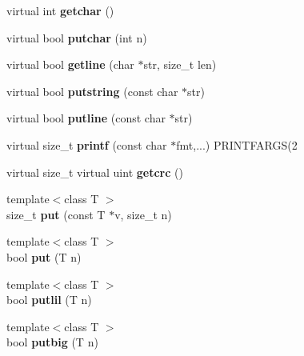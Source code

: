 \begin{DoxyCompactItemize}
virtual int {\bfseries getchar} ()
\item 
\mbox{\label{structstream_a41a4d74c57bebc7e69f9c04f8e6f13c1}} 
virtual bool {\bfseries putchar} (int n)
\item 
\mbox{\label{structstream_a699f7addf5113e0b63219869443d784c}} 
virtual bool {\bfseries getline} (char $\ast$str, size\+\_\+t len)
\item 
\mbox{\label{structstream_ad98a69b7c1f7d6d388b1020c5dcd452a}} 
virtual bool {\bfseries putstring} (const char $\ast$str)
\item 
\mbox{\label{structstream_aabdf3786ae1a58bd8d92f9d4da78e80d}} 
virtual bool {\bfseries putline} (const char $\ast$str)
\item 
\mbox{\label{structstream_abc5967119b7f84b828ff6e0829f3b1b3}} 
virtual size\+\_\+t {\bfseries printf} (const char $\ast$fmt,...) P\+R\+I\+N\+T\+F\+A\+R\+GS(2
\item 
\mbox{\label{structstream_ac80efd5644d173b8f9a4d4233dd81875}} 
virtual size\+\_\+t virtual uint {\bfseries getcrc} ()
\item 
\mbox{\label{structstream_afceda21166198ae324a48abc0e1d9aeb}} 
{\footnotesize template$<$class T $>$ }\\size\+\_\+t {\bfseries put} (const T $\ast$v, size\+\_\+t n)
\item 
\mbox{\label{structstream_a2756fb1f35a01a67048a97965d0b5d69}} 
{\footnotesize template$<$class T $>$ }\\bool {\bfseries put} (T n)
\item 
\mbox{\label{structstream_a70a8d946550e0c2f892a1b9d775d6833}} 
{\footnotesize template$<$class T $>$ }\\bool {\bfseries putlil} (T n)
\item 
\mbox{\label{structstream_a005490189482361b6af45fe06eb32c49}} 
{\footnotesize template$<$class T $>$ }\\bool {\bfseries putbig} (T n)
\item 

\end{DoxyCompactItemize}
